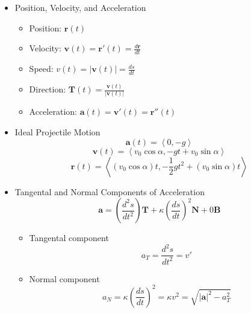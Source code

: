 \documentclass[12pt]{article}
\renewcommand{\vec}[1]{\mathbf{#1}}
\newcommand{\<}{\left<}
\renewcommand{\>}{\right>}
\begin{document}
  \begin{itemize}

    \item Position, Velocity, and Acceleration
      \begin{itemize}
      \item Position: $\vec{r}(t)$
      \item Velocity: $\vec{v}(t) = \vec{r}'(t) = \frac{d\vec{r}}{dt}$
      \item Speed: $v(t)=|\vec{v}(t)|=\frac{ds}{dt}$ 
      \item Direction: $\vec{T}(t)=\frac{\vec{v}(t)}{|\vec{v}(t)|}$ 
      \item Acceleration: $\vec{a}(t) = \vec{v}'(t) = \vec{r}''(t)$ 
      \end{itemize}

    \item Ideal Projectile Motion
      \[\vec{a}(t)=\<0,-g\>\]
      \[\vec{v}(t)=\<v_0\cos\alpha,-gt+v_0\sin\alpha\>\]
      \[\vec{r}(t)=\<(v_0\cos\alpha)t,-\frac{1}{2}gt^2+(v_0\sin\alpha)t\>\]
      
    \item Tangental and Normal Components of Acceleration
      \[\vec{a} = \left(\frac{d^2s}{dt^2}\right)\vec{T} + \kappa\left(\frac{ds}{dt}\right)^2\vec{N}+0\vec{B}\]
      \begin{itemize}
        \item Tangental component
          \[a_T = \frac{d^2s}{dt^2} = v' \]
        \item Normal component
          \[a_N = \kappa\left(\frac{ds}{dt}\right)^2 = \kappa v^2 = \sqrt{|\vec{a}|^2 - a_T^2}\]
      \end{itemize}
    
      

\end{itemize}
\end{document}
